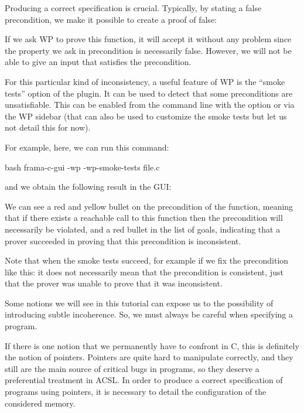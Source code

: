 Producing a correct specification is crucial. Typically, by stating a
false precondition, we make it possible to create a proof of
false:




If we ask WP to prove this function, it will accept it without any problem
since the property we ask in precondition is necessarily false.
However, we will not be able to give an input that satisfies the
precondition.


For this particular kind of inconsistency, a useful feature of WP is
the ``smoke tests'' option of the plugin. It can be used to detect that
some preconditions are unsatisfiable. This can be enabled from the command line
with the option  or via the WP sidebar (that can
also be used to customize the smoke tests but let us not detail this for now).




For example, here, we can run this command:


\begin{CodeBlock}{bash}
  frama-c-gui -wp -wp-smoke-tests file.c
\end{CodeBlock}


and we obtain the following result in the GUI:




We can see a red and yellow bullet on the precondition of the function,
meaning that if there exists a reachable call to this function then the
precondition will necessarily be violated, and a red bullet in the
list of goals, indicating that a prover succeeded in proving that this
precondition is inconsistent.


Note that when the smoke tests succeed, for example if we fix the
precondition like this:
it does not necessarily mean that the precondition is consistent, just
that the prover was unable to prove that it was inconsistent.


Some notions we will see in this tutorial can expose us to the
possibility of introducing subtle incoherence. So, we must always be
careful when specifying a program.




If there is one notion that we permanently have to confront in C,
this is definitely the notion of pointers. Pointers are quite
hard to manipulate correctly, and they still are the main source of
critical bugs in programs, so they deserve a preferential treatment
in ACSL. In order to produce a correct specification of programs using
pointers, it is necessary to detail the configuration of the considered
memory.

